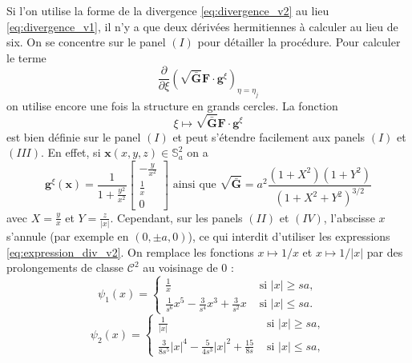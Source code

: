 Si l'on utilise la forme de la divergence \eqref{eq:divergence_v2} au lieu \eqref{eq:divergence_v1}, il n'y a que deux dérivées hermitiennes à calculer au lieu de six. 
On se concentre sur le panel $(I)$ pour détailler la procédure. Pour calculer le terme
\begin{equation}
\dfrac{\partial}{\partial \xi} \left( \sqrt{\bar{\mathbf{G}}} \mathbf{F} \cdot \mathbf{g}^{\xi} \right)_{\eta = \eta_j}
\end{equation}
on utilise encore une fois la structure en grands cercles. La fonction
\begin{equation}
\xi \mapsto \sqrt{\bar{\mathbf{G}}} \mathbf{F} \cdot \mathbf{g}^{\xi}
\end{equation}
est bien définie sur le panel $(I)$ et peut s'étendre facilement aux panels $(I)$ et $(III)$. En effet, si $\mathbf{x}(x,y,z) \in \mathbb{S}_a^2$ on a
\begin{equation}
\mathbf{g}^{\xi} (\mathbf{x} ) = \dfrac{1}{1 + \frac{y^2}{x^2}} \begin{bmatrix}
- \frac{y}{x^2} \\
\frac{1}{x} \\
0
\end{bmatrix} \text{ ainsi que } \sqrt{\bar{\mathbf{G}}} = a^2 \dfrac{(1+X^2)(1+Y^2)}{(1+X^2+Y^2)^{3/2}}
\label{eq:expression_div_v2}
\end{equation}
avec $X=\frac{y}{x}$ et $Y = \frac{z}{|x|}$.
Cependant, sur les panels $(II)$ et $(IV)$, l’abscisse $x$ s’annule (par exemple en $(0,\pm a,0)$), ce qui interdit d'utiliser les expressions \eqref{eq:expression_div_v2}.
On remplace les fonctions $x \mapsto 1/x$ et $x \mapsto 1/|x|$ par des prolongements de classe $\mathcal{C}^2$ au voisinage de $0$ :
\begin{equation}
\psi_1 (x) = \left\lbrace
\begin{array}{ll}
\frac{1}{x} & \text{ si } |x| \geq s a, \\
\frac{1}{s^6} x^5 - \frac{3}{s^4} x^3 + \frac{3}{s^2} x & \text{ si } |x| \leq s a.
\end{array}
\right.
\end{equation} 
\begin{equation}
\psi_2 (x) = \left\lbrace
\begin{array}{ll}
\frac{1}{|x|} & \text{ si } |x| \geq s a, \\
\frac{3}{8s^5} |x|^4 - \frac{5}{4s^3} |x|^2 + \frac{15}{8s} & \text{ si } |x| \leq s a,
\end{array}
\right.
\end{equation} 
